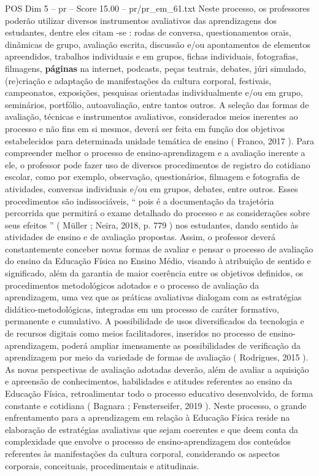 \begin{textsample}{POS Dim 5 – pr – Score 15.00 – pr/pr\_em\_61.txt}
Neste processo, os professores poderão utilizar diversos instrumentos avaliativos das aprendizagens dos estudantes, dentre eles citam -se : rodas de conversa, questionamentos orais, dinâmicas de grupo, avaliação escrita, discussão e/ou apontamentos de elementos apreendidos, trabalhos individuais e em grupos, fichas individuais, fotografias, filmagens, \textbf{páginas} na internet, podcasts, peças teatrais, debates, júri simulado, (re)criação e adaptação de manifestações da cultura corporal, festivais, campeonatos, exposições, pesquisas orientadas individualmente e/ou em grupo, seminários, portfólio, autoavaliação, entre tantos outros.
A seleção das formas de avaliação, técnicas e instrumentos avaliativos, considerados meios inerentes ao processo e não fins em si mesmos, deverá ser feita em função dos objetivos estabelecidos para determinada unidade temática de ensino ( Franco, 2017 ).
Para compreender melhor o processo de ensino-aprendizagem e a avaliação inerente a ele, o professor pode fazer uso de diversos procedimentos de registro do cotidiano escolar, como por exemplo, observação, questionários, filmagem e fotografia de atividades, conversas individuais e/ou em grupos, debates, entre outros.
Esses procedimentos são indissociáveis, “ pois é a documentação da trajetória percorrida que permitirá o exame detalhado do processo e as considerações sobre seus efeitos ” ( Müller ; Neira, 2018, p. 779 ) nos estudantes, dando sentido às atividades de ensino e de avaliação propostas.
Assim, o professor deverá constantemente conceber novas formas de avaliar e pensar o processo de avaliação do ensino da Educação Física no Ensino Médio, visando à atribuição de sentido e significado, além da garantia de maior coerência entre os objetivos definidos, os procedimentos metodológicos adotados e o processo de avaliação da aprendizagem, uma vez que as práticas avaliativas dialogam com as estratégias didático-metodológicas, integradas em um processo de caráter formativo, permanente e cumulativo.
A possibilidade de usos diversificados da tecnologia e de recursos digitais como meios facilitadores, inseridos no processo de ensino-aprendizagem, poderá ampliar imensamente as possibilidades de verificação da aprendizagem por meio da variedade de formas de avaliação ( Rodrigues, 2015 ).
As novas perspectivas de avaliação adotadas deverão, além de avaliar a aquisição e apreensão de conhecimentos, habilidades e atitudes referentes ao ensino da Educação Física, retroalimentar todo o processo educativo desenvolvido, de forma constante e cotidiana ( Bagnara ; Fensterseifer, 2019 ).
Neste processo, o grande enfrentamento para a aprendizagem em relação à Educação Física reside na elaboração de estratégias avaliativas que sejam coerentes e que deem conta da complexidade que envolve o processo de ensino-aprendizagem dos conteúdos referentes às manifestações da cultura corporal, considerando os aspectos corporais, conceituais, procedimentais e atitudinais.

\end{textsample}
